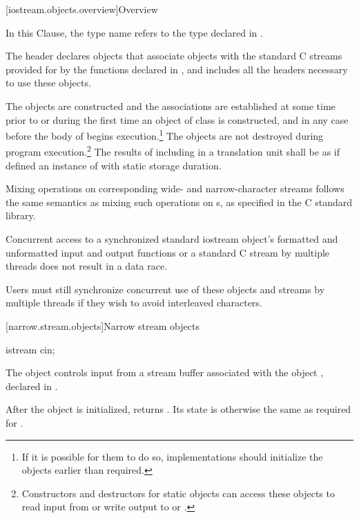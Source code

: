 [iostream.objects.overview]{Overview}

\pnum
In this Clause, the type name  refers to
the type  declared in .

\pnum
The header 
declares objects that associate objects with the
standard C streams provided for by the functions declared in
, and includes all the headers necessary to use these objects.

\pnum
The objects are constructed and the associations are established at some
time prior to or during the first time an object of class
 is constructed, and in any case before the body
of  begins execution.\footnote{If it is possible for them to do so, implementations should
initialize the objects earlier than required.}
The objects are not destroyed during program execution.\footnote{Constructors and destructors for static objects can
access these objects to read input from
or write output to
or
.
}
The results of including  in a translation unit shall be as if
 defined an instance of  with static
storage duration.

\pnum
Mixing operations on corresponding wide- and narrow-character streams
follows the same semantics as mixing such operations on
s,
as specified in the C standard library.

\pnum
Concurrent access to a synchronized standard iostream object's formatted and unformatted input and output functions or a standard C stream by multiple threads does not result in a data race.
\begin{note}
Users must still synchronize concurrent use of these objects and streams by multiple threads if they wish to avoid interleaved characters.
\end{note}


[narrow.stream.objects]{Narrow stream objects}

%
\begin{itemdecl}
istream cin;
\end{itemdecl}

\begin{itemdescr}
\pnum
The object 
controls input from a stream buffer associated with the object ,
declared in .

\pnum
After the object
is initialized,
returns
.
Its state is otherwise the same as required for
.
\end{itemdescr}

